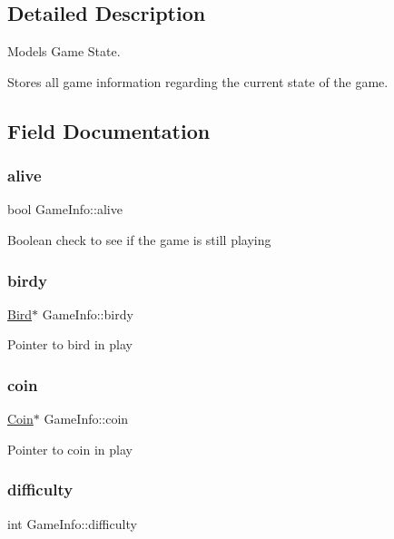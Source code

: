 \subsection{Detailed Description}
Models Game State. 

Stores all game information regarding the current state of the game. 

\subsection{Field Documentation}
\mbox{\label{struct_game_info_a47a0b9a98cef651d98214b126d6ed7ec}} 
\subsubsection{\texorpdfstring{alive}{alive}}
{\footnotesize\ttfamily bool Game\+Info\+::alive}

Boolean check to see if the game is still playing \mbox{\label{struct_game_info_aee4a8447023b7f3f3ceb9588cd84c7ce}} 
\subsubsection{\texorpdfstring{birdy}{birdy}}
{\footnotesize\ttfamily \hyperlink{struct_bird}{Bird}$\ast$ Game\+Info\+::birdy}

Pointer to bird in play \mbox{\label{struct_game_info_a7aa65ed4a2ab803f3cad3a2eb1e0947b}} 
\subsubsection{\texorpdfstring{coin}{coin}}
{\footnotesize\ttfamily \hyperlink{struct_coin}{Coin}$\ast$ Game\+Info\+::coin}

Pointer to coin in play \mbox{\label{struct_game_info_ae502ef89edb1039e4bd2e703f8d407b4}} 
\subsubsection{\texorpdfstring{difficulty}{difficulty}}
{\footnotesize\ttfamily int Game\+Info\+::difficulty}

